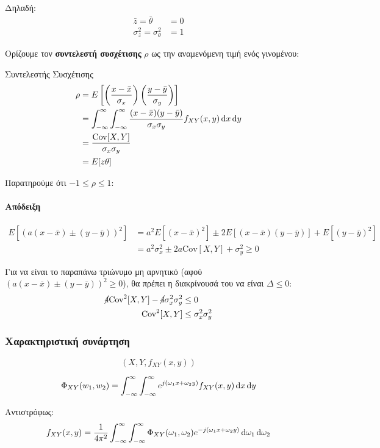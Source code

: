 \documentclass[11pt,a4paper,notitlepage,fleqn,draft]{article}
\begin{document}
Δηλαδή:
\begin{align*}
\bar z = \bar \theta &= 0 \\
\sigma_z^2 = \sigma_\theta^2 &= 1
\end{align*}

Ορίζουμε τον \textbf{συντελεστή συσχέτισης} \( \rho \) ως την αναμενόμενη
τιμή ενός γινομένου:
\begin{defn}{Συντελεστής Συσχέτισης}{}
	\begin{align*}
	\rho &= E\left[\left(
	\frac{x-\bar x}{\sigma_x}
	\right)\left(
	\frac{y-\bar y}{\sigma_y}
	\right)
	\right] \\ &= \int_{-\infty}^{\infty} \int_{-\infty}^{\infty}
	\frac{(x-\bar x)(y-\bar y)}{\sigma_x \sigma_y}f_{XY}(x,y)\mathop{}\!\mathrm{d} x
	\mathop{}\!\mathrm{d} y \\
	&= \frac{\mathrm{Cov}[X,Y]}{\sigma_x\sigma_y}\\
	&= E[z\theta]
	\end{align*}
\end{defn}

Παρατηρούμε ότι \( -1 \leq \rho \leq 1 \):
\paragraph{Απόδειξη}
\begin{align*}
E\left[
\left(a(x-\bar x)\pm (y-\bar y)\right)^2
\right] &=
a^2E\left[(x-\bar x)^2\right] \pm 2E\left[(x-\bar x)(y-\bar y)\right]
+E\left[(y-\bar y)^2\right]
\\ &= a^2\sigma_x^2 \pm 2a\mathrm{Cov}[X,Y] + \sigma_y^2 \geq 0
\end{align*}

Για να είναι το παραπάνω τριώνυμο μη αρνητικό
(αφού \( \left(a(x-\bar x)\pm(y-\bar y)\right)^2 \geq 0 \)),
θα πρέπει η διακρίνουσά
του να είναι \( \Delta \leq 0 \):
\begin{align*}
	\cancel{4}\mathrm{Cov}^2[X,Y]-\cancel{4}\sigma_x^2\sigma_y^2 &\leq 0
	\\
	\mathrm{Cov}^2[X,Y]&\leq \sigma_x^2\sigma_y^2
\end{align*}

\subsubsection{Χαρακτηριστική συνάρτηση}
\[
(X,Y,f_{XY}(x,y))
\]
\begin{defn}{}{}
    \[
    \Phi_{XY}(w_1,w_2) = \int_{-\infty}^{\infty} \int_{-\infty}^{\infty}
    e^{j(\omega_1 x + \omega_2 y)} f_{XY}(x,y)\mathop{}\!\mathrm{d} x\mathop{}\!\mathrm{d} y
    \]
\end{defn}
Αντιστρόφως:\[
f_{XY}(x,y) = \frac{1}{4\pi^2} \int_{-\infty}^{\infty}
\int_{-\infty}^{\infty}
\Phi_{XY}(\omega_1,\omega_2) e^{-j(\omega_1 x + \omega_2 y)}
\mathop{}\!\mathrm{d} \omega_1 \mathop{}\!\mathrm{d} \omega_2
\]
\end{document}
